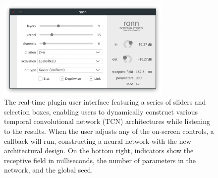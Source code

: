 \documentclass{article}
\begin{document}
\begin{figure}[h]
  \centering 
  \includegraphics[width=0.75\textwidth]{ronn-vst-ui.png}  
  \caption{The real-time plugin user interface featuring a series of sliders and selection boxes, 
  enabling users to dynamically construct various temporal convolutional network (TCN) architectures while listening to the results.
  When the user adjusts any of the on-screen controls, a callback will run, 
  constructing a neural network with the new architectural design. 
  On the bottom right, indicators show the receptive field in milliseconds, 
  the number of parameters in the network, and the global seed. 
  }
  \label{fig:ui}
\end{figure}

\vspace{0.6cm}
\end{document}
